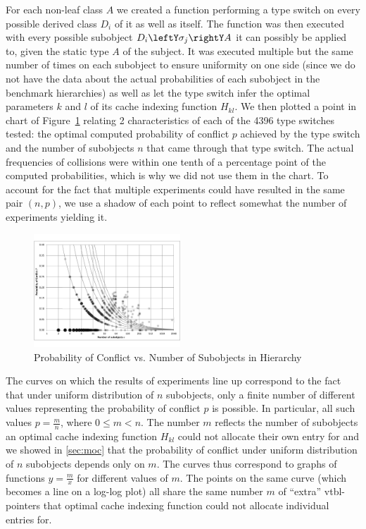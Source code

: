 For each non-leaf class $A$ we created a function performing a type switch on 
every possible derived class $D_i$ of it as well as itself. The function was 
then executed with every possible subobject $D_i\leftY\sigma_j\rightY A$ it can  
possibly be applied to, given the static type $A$ of the subject. It was 
executed multiple but the same number of times on each subobject to ensure 
uniformity on one side (since we do not have the data about the actual 
probabilities of each subobject in the benchmark hierarchies) as well as let the 
type switch infer the optimal parameters $k$ and $l$ of its cache indexing 
function $H_{kl}$. We then plotted a point in chart of Figure~\ref{fig:prob} 
relating 2 characteristics of each of the 4396 type switches tested: the optimal 
computed probability of conflict $p$ achieved by the type switch and the number 
of subobjects $n$ that came through that type switch. The actual frequencies of 
collisions were within one tenth of a percentage point of the computed 
probabilities, which is why we did not use them in the chart. To account for the 
fact that multiple experiments could have resulted in the same pair $(n,p)$, we 
use a shadow of each point to reflect somewhat the number of experiments 
yielding it.

\begin{figure}[htbp]
  \centering
    \includegraphics[width=0.49\textwidth]{ClassHierarchies.pdf}
  \caption{Probability of Conflict vs. Number of Subobjects in Hierarchy}
  \label{fig:prob}
\end{figure}

The curves on which the results of experiments line up correspond to the fact 
that under uniform distribution of $n$ subobjects, only a finite number of 
different values representing the probability of conflict $p$ is possible. In 
particular, all such values $p=\frac{m}{n}$, where $0 \le m < n$. The number $m$ 
reflects the number of subobjects an optimal cache indexing function $H_{kl}$ 
could not allocate their own entry for and we showed in \textsection\ref{sec:moc} 
that the probability of conflict under uniform distribution of $n$ subobjects 
depends only on $m$. The curves thus correspond to graphs of functions 
$y=\frac{m}{x}$ for different values of $m$. The points on the same curve (which 
becomes a line on a log-log plot) all share the same number $m$ of ``extra'' 
vtbl-pointers that optimal cache indexing function could not allocate individual 
entries for.

